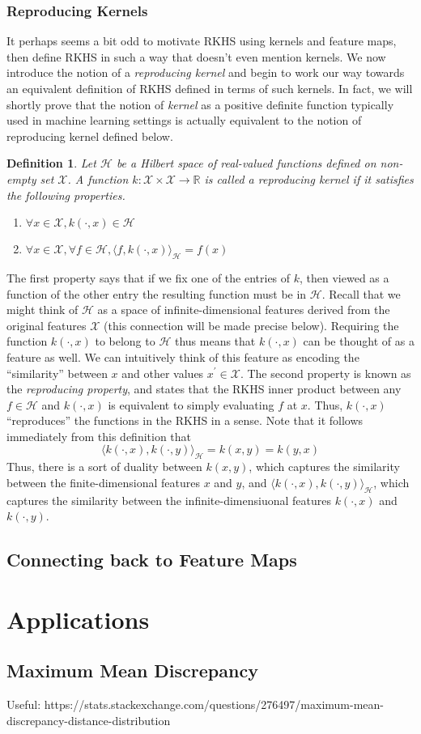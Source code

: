 \documentclass[12pt]{article}
\newcommand{\R}{\mathbb{R}}
\newtheorem{definition}{Definition}
\begin{document}
\subsubsection{Reproducing Kernels}
It perhaps seems a bit odd to motivate RKHS using kernels and feature maps, then define RKHS in such a way that doesn't even mention kernels. We now introduce the notion of a \textit{reproducing kernel} and begin to work our way towards an equivalent definition of RKHS defined in terms of such kernels. In fact, we will shortly prove that the notion of \textit{kernel} as a positive definite function typically used in machine learning settings is actually equivalent to the notion of reproducing kernel defined below. 
\begin{definition}
Let $\mathcal{H}$ be a Hilbert space of real-valued functions defined on non-empty set $\mathcal{X}$. A function $k: \mathcal{X} \times \mathcal{X} \to \R$ is called a reproducing kernel if it satisfies the following properties. 
\begin{enumerate}
\item $\forall x \in \mathcal{X}, k(\cdot, x) \in \mathcal{H}$
\item $\forall x \in \mathcal{X}, \forall f \in \mathcal{H}, \langle f, k(\cdot, x)\rangle_{\mathcal{H}} = f(x)$
\end{enumerate}
\end{definition} 
The first property says that if we fix one of the entries of $k$, then viewed as a function of the other entry the resulting function must be in $\mathcal{H}$. Recall that we might think of $\mathcal{H}$ as a space of infinite-dimensional features derived from the original features $\mathcal{X}$ (this connection will be made precise below). Requiring the function $k(\cdot, x)$ to belong to $\mathcal{H}$ thus means that $k(\cdot, x)$ can be thought of as a feature as well. We can intuitively think of this feature as encoding the ``similarity'' between $x$ and other values $x^\prime \in \mathcal{X}$. The second property is known as the \textit{reproducing property}, and states that the RKHS inner product between any $f \in \mathcal{H}$ and $k(\cdot, x)$ is equivalent to simply evaluating $f$ at $x$. Thus, $k(\cdot, x)$ ``reproduces'' the functions in the RKHS in a sense. Note that it follows immediately from this definition that 
\[\langle k(\cdot, x), k(\cdot, y) \rangle_{\mathcal{H}} = k(x, y) = k(y, x) \]
Thus, there is a sort of duality between $k(x, y)$, which captures the similarity between the finite-dimensional features $x$ and $y$, and 
$\langle k(\cdot, x), k(\cdot, y) \rangle_{\mathcal{H}}$, which captures the similarity between the infinite-dimensiuonal features $k(\cdot, x)$ and $k(\cdot, y)$. 


\subsection{Connecting back to Feature Maps}


\section{Applications}
\subsection{Maximum Mean Discrepancy}
Useful: https://stats.stackexchange.com/questions/276497/maximum-mean-discrepancy-distance-distribution
\end{document}
